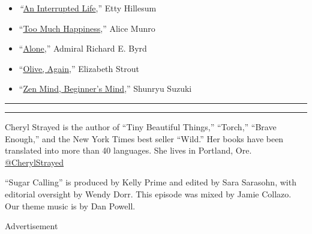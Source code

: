 \begin{itemize}
\tightlist
\item
  \emph{``}\href{https://www.amazon.com/Etty-Hillesum-Interrupted-1941-1943-Westerbork/dp/0805050876}{An
  Interrupted Life},'' Etty Hillesum
\end{itemize}

\begin{itemize}
\item
  ``\href{https://www.amazon.com/Too-Much-Happiness-Vintage-International-ebook/dp/B002VT6C0K/ref=sr_1_1?dchild=1\&keywords=too+much+happiness\&qid=1586895086\&s=books\&sr=1-1}{Too
  Much Happiness},'' Alice Munro
\item
  ``\href{https://www.amazon.com/Alone-Classic-Adventure-Richard-Byrd-ebook/dp/B004HD4A1Q/ref=sr_1_1?dchild=1\&keywords=alone+admiral+byrd\&qid=1586895161\&s=books\&sr=1-1}{Alone},''
  Admiral Richard E. Byrd
\item
  ``\href{https://www.amazon.com/Olive-Again-Novel-Elizabeth-Strout-ebook/dp/B07NCPLS2R/ref=sr_1_1?dchild=1\&keywords=olive\%2C+again\&qid=1586895199\&s=books\&sr=1-1}{Olive,
  Again},'' Elizabeth Strout
\item
  ``\href{https://www.amazon.com/Zen-Mind-Beginners-Informal-Meditation-ebook/dp/B00I8USOM0/ref=sr_1_2?crid=ZC4QSZUMV9AO\&dchild=1\&keywords=zen+mind\%2C+beginner\%27s+mind\&qid=1586895238\&s=books\&sprefix=zen+mind\%2C+be\%2Cstripbooks\%2C149\&sr=1-2}{Zen
  Mind, Beginner's Mind},'' Shunryu Suzuki
\end{itemize}

\begin{center}\rule{0.5\linewidth}{\linethickness}\end{center}

\begin{center}\rule{0.5\linewidth}{\linethickness}\end{center}

Cheryl Strayed is the author of ``Tiny Beautiful Things,'' ``Torch,''
``Brave Enough,'' and the New York Times best seller ``Wild.'' Her books
have been translated into more than 40 languages. She lives in Portland,
Ore.
\href{https://twitter.com/CherylStrayed?ref_src=twsrc\%5Egoogle\%7Ctwcamp\%5Eserp\%7Ctwgr\%5Eauthor}{@CherylStrayed}

``Sugar Calling'' is produced by Kelly Prime and edited by Sara
Sarasohn, with editorial oversight by Wendy Dorr. This episode was mixed
by Jamie Collazo. Our theme music is by Dan Powell.

Advertisement

